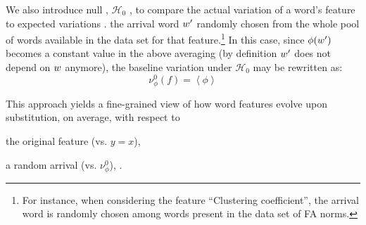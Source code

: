 We also introduce  null , $\mathcal{H}_0$ , to compare the actual variation of a word's feature to expected variations .
 the arrival word $w'$  randomly chosen from the whole pool of words available in the data set for that feature.\footnote{
For instance, when considering the feature ``Clustering coefficient'', the arrival word is randomly chosen among words present in the data set of FA norms.
}
In this case, since $\phi(w')$ becomes a constant value in the above averaging (by definition $w'$ does not depend on $w$ anymore), the baseline variation under $\mathcal{H}_0$ may be rewritten as:
$$\nu_{\phi}^0 (f) = \left<\phi\right>$$

This approach yields a fine-grained view of how word features evolve upon substitution, on average, with respect to
\begin{seriate}
\item the original feature (\hbox{vs.} $y=x$),
\item a random arrival (\hbox{vs.} $\nu_{\phi}^0$), .
\end{seriate}

\medskip


